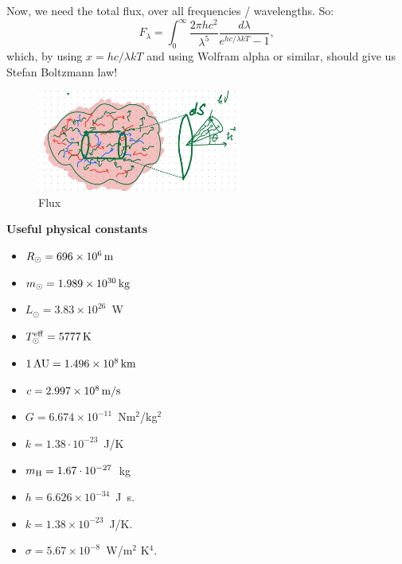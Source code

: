 \documentclass[12pt]{article}
\begin{document}
Now, we need the total flux, over all frequencies / wavelengths. So:
\begin{equation}
F_\lambda = \int_0^{\infty} \frac{2 \pi hc^2}{\lambda^5} \frac{d\lambda}{e^{hc/\lambda k T} - 1},
\end{equation}
which, by using $x = hc/\lambda k T$ and using Wolfram alpha or
similar, should give us Stefan Boltzmann law!

\begin{figure}
\includegraphics[width=0.6\textwidth]{flux.jpg}
\caption{Flux}
\end{figure}

 
{\bf Useful physical constants}
\begin{itemize}
  \item $R_{\odot} = 696 \times 10^6\,{\rm m}$
  \item $m_{\odot} = 1.989 \times 10^{30}\,{\rm kg}$
  \item $L_{\odot} = 3.83 \times 10^{26}$~W
  \item $T^{\rm eff}_{\odot} = 5777\,{\rm K}$
  \item $1\,{\rm AU} = 1.496 \times 10^8\,{\rm km}$
  \item $c = 2.997 \times 10^8\,{\rm m/s}$
  \item $G = 6.674 \times 10^{-11}$~Nm$^2$/kg$^2$
  \item $k = 1.38\cdot10^{-23}$~J/K
  \item $m_{\rm H} = 1.67\cdot10^{-27}$~kg
  \item $h=6.626 \times 10^{-34}$~J~s.
  \item $k=1.38 \times 10^{-23}$~J/K.
  \item $\sigma=5.67 \times 10^{-8}$~W/m$^2$ K$^4$.
\end{itemize}
\end{document}
